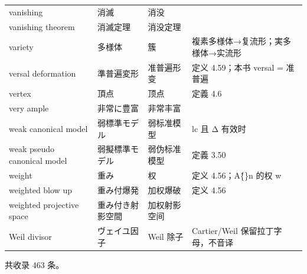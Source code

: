 \begin{longtable}{@{}>{\raggedright\arraybackslash}p{}>{\raggedright\arraybackslash}p{}>{\raggedright\arraybackslash}p{}>{\raggedright\arraybackslash}p{}@{}}
vanishing & 消滅 & 消没 &  \\
vanishing theorem & 消滅定理 & 消没定理 &  \\
variety & 多様体 & 簇 & 複素多様体→复流形；実多様体→实流形 \\
versal deformation & 準普遍変形 & 准普遍形变 & 定义 4.59；本书 versal = 准普遍 \\
vertex & 頂点 & 顶点 & 定義 4.6 \\
very ample & 非常に豊富 & 非常丰富 &  \\
weak canonical model & 弱標準モデル & 弱标准模型 & lc 且 Δ 有效时 \\
weak pseudo canonical model & 弱擬標準モデル & 弱伪标准模型 & 定義 3.50 \\
weight & 重み & 权 & 定义 4.56；A\^\{\}n 的权 w \\
weighted blow up & 重み付爆発 & 加权爆破 & 定义 4.56 \\
weighted projective space & 重み付き射影空間 & 加权射影空间 &  \\
Weil divisor & ヴェイユ因子 & Weil 除子 & Cartier/Weil 保留拉丁字母，不音译 \\
\bottomrule
\end{longtable}

\begin{flushleft}
\small 共收录 463 条。
\end{flushleft}
